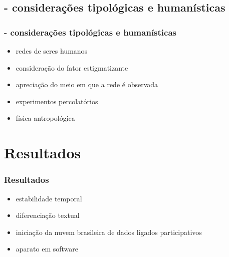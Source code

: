 \documentclass[10pt]{beamer}
\begin{document}
\begin{frame}
\subsection{- considerações tipológicas e humanísticas}
\frametitle{- considerações tipológicas e humanísticas}
\begin{itemize}
	\item redes de seres humanos
	\item consideração do fator estigmatizante
	\item apreciação do meio em que a rede é observada
	\item experimentos percolatórios
	\item física antropológica
\end{itemize}
\end{frame}

\section{Resultados}
\begin{frame}
\frametitle{Resultados}
\begin{itemize}
	\item estabilidade temporal
	\item diferenciação textual
	\item iniciação da nuvem brasileira de dados ligados participativos
	\item aparato em software
\end{itemize}
\end{frame}
\end{document}
